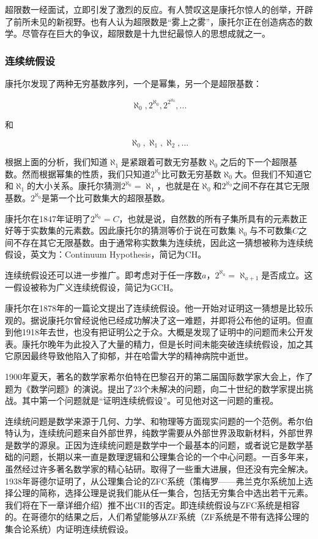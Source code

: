 \documentclass{article}
\begin{document}
超限数一经面试，立即引发了激烈的反应。有人赞叹这是康托尔惊人的创举，开辟了前所未见的新视野。也有人认为超限数是“雾上之雾”，康托尔正在创造病态的数学。尽管存在巨大的争议，超限数是十九世纪最惊人的思想成就之一。

\subsubsection{连续统假设}
  
康托尔发现了两种无穷基数序列，一个是幂集，另一个是超限基数：

\[
\aleph_0, 2^{\aleph_0}, 2^{2^{\aleph_0}}, ...
\]

和

\[
\aleph_0, \aleph_1, \aleph_2, ...
\]

根据上面的分析，我们知道$\aleph_1$是紧跟着可数无穷基数$\aleph_0$之后的下一个超限基数。然而根据幂集的性质，我们只知道$2^{\aleph_0}$比可数无穷基数$\aleph_0$大。但我们不知道它和$\aleph_1$的大小关系。康托尔猜测$2^{\aleph_0} = \aleph_1$，也就是在$\aleph_0$和$2^{\aleph_0}$之间不存在其它无限基数。$2^{\aleph_0}$是第一个比可数集大的超限基数。

康托尔在1847年证明了$2^{\aleph_0} = C$，也就是说，自然数的所有子集所具有的元素数正好等于实数集的元素数。因此康托尔的猜测等价于说在可数集$\aleph_0$与不可数集$C$之间不存在其它无限基数。由于通常称实数集为连续统，因此这一猜想被称为连续统假设，英文为：Continuum Hypothesis，简记为CH。

连续统假设还可以进一步推广。即考虑对于任一序数$a$，$2^{\aleph_a} = \aleph_{a+1}$是否成立。这一假设被称为广义连续统假设，简记为GCH。

康托尔在1878年的一篇论文提出了连续统假设。他一开始对证明这一猜想是比较乐观的。据说康托尔曾经说他已经成功解决了这一难题，并即将公布他的证明。但直到他1918年去世，也没有把证明公之于众。大概是发现了证明中的问题而未公开发表。康托尔晚年为此投入了大量的精力，但是长时间未能突破连续统假设，加之其它原因最终导致他陷入了抑郁，并在哈雷大学的精神病院中逝世。

1900年夏天，著名的数学家希尔伯特在巴黎召开的第二届国际数学家大会上，作了题为《数学问题》的演说。提出了23个未解决的问题，向二十世纪的数学家提出挑战。其中第一个问题就是“证明连续统假设”。可见他对这一问题的重视。

连续统问题是数学来源于几何、力学、和物理等方面现实问题的一个范例。希尔伯特认为，连续统问题来自外部世界，纯数学需要从外部世界汲取新材料，外部世界是数学的源泉。正因为连续统问题是数学中一个最基本的问题，或者说它是数学基础的问题，长期以来一直是数理逻辑和公理集合论的一个中心问题。一百多年来，虽然经过许多著名数学家的精心钻研。取得了一些重大进展，但还没有完全解决。1938年哥德尔证明了，从公理集合论的ZFC系统（策梅罗——弗兰克尔系统加上选择公理的简称，选择公理是说我们能从任一集合，包括无穷集合中选出若干元素。我们将在下一章详细介绍）推不出CH的否定。即连续统假设与ZFC系统是相容的。在哥德尔的结果之后，人们希望能够从ZF系统（ZF系统是不带有选择公理的集合论系统）内证明连续统假设。
\end{document}
